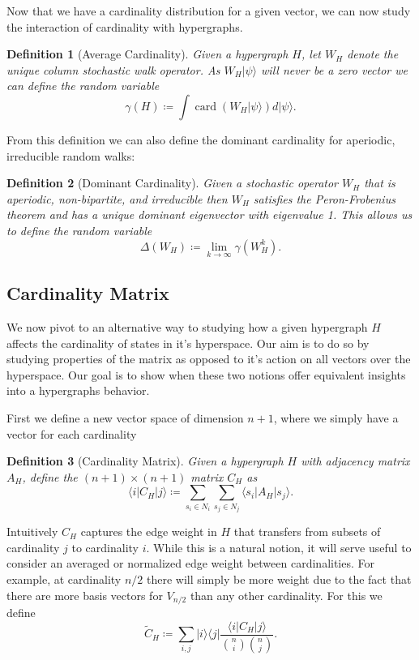 \documentclass{article}
\newcommand{\ket}[1]{|#1\rangle}
\newcommand{\bra}[1]{\langle #1|}
\newcommand{\ketbra}[2]{| #1\rangle\! \langle #2|}
\newcommand{\parens}[1]{\left( #1 \right)}
\DeclareMathOperator{\card}{card}
\newcommand{\cardi}[1]{\card \parens{ #1 }}
\newcommand{\base}[1]{\ket{s_{#1}}}
\newcommand{\dual}[1]{\bra{s_{#1}}}
\newtheorem{defn}{Definition}
\begin{document}
Now that we have a cardinality distribution for a given vector, we can now study the interaction of cardinality with hypergraphs.
\begin{defn}[Average Cardinality]
    Given a hypergraph $H$, let $W_H$ denote the unique column stochastic walk operator. As $W_H \ket{\psi}$ will never be a zero vector we can define the random variable
    \begin{equation}
        \gamma(H) \coloneqq \int \cardi{W_H \ket{\psi}} d\ket{\psi}.
    \end{equation}
\end{defn}
From this definition we can also define the dominant cardinality for aperiodic, irreducible random walks:
\begin{defn}[Dominant Cardinality]
    Given a stochastic operator $W_H$ that is aperiodic, non-bipartite, and irreducible then $W_H$ satisfies the Peron-Frobenius theorem and has a unique dominant eigenvector with eigenvalue 1. This allows us to define the random variable
    \begin{equation}
        \Delta(W_H) \coloneqq \lim_{k \to \infty} \gamma(W_H^k).
    \end{equation}
\end{defn}

\subsection{Cardinality Matrix}
We now pivot to an alternative way to studying how a given hypergraph $H$ affects the cardinality of states in it's hyperspace. Our aim is to do so by studying properties of the matrix as opposed to it's action on all vectors over the hyperspace. Our goal is to show when these two notions offer equivalent insights into a hypergraphs behavior.

First we define a new vector space of dimension $n+1$, where we simply have a vector for each cardinality
\begin{defn}[Cardinality Matrix]
    Given a hypergraph $H$ with adjacency matrix $A_H$, define the $(n+1) \times (n+1)$ matrix $C_H$ as
    \begin{equation}
        \bra{i} C_H \ket{j} \coloneqq \sum_{s_i \in N_i} \sum_{s_j \in N_j} \dual{i} A_H \base{j}.
    \end{equation}
\end{defn}
Intuitively $C_H$ captures the edge weight in $H$ that transfers from subsets of cardinality $j$ to cardinality $i$. While this is a natural notion, it will serve useful to consider an averaged or normalized edge weight between cardinalities. For example, at cardinality $n/2$ there will simply be more weight due to the fact that there are more basis vectors for $V_{n/2}$ than any other cardinality. For this we define
\begin{equation}
    \widetilde{C}_H \coloneqq \sum_{i,j} \ketbra{i}{j} \frac{\bra{i} C_H \ket{j}}{\binom{n}{i} \binom{n}{j}}.
\end{equation}
\end{document}
